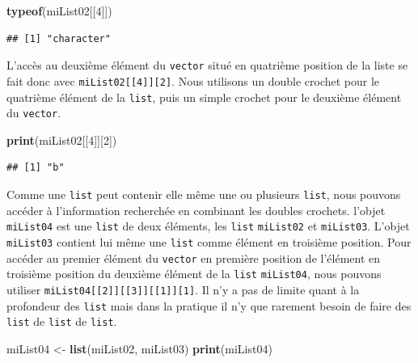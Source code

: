 \documentclass[]{book}
\newenvironment{Shaded}{\begin{snugshade}}{\end{snugshade}}
\newcommand{\KeywordTok}[1]{\textcolor[rgb]{0.13,0.29,0.53}{\textbf{#1}}}
\newcommand{\DecValTok}[1]{\textcolor[rgb]{0.00,0.00,0.81}{#1}}
\newcommand{\StringTok}[1]{\textcolor[rgb]{0.31,0.60,0.02}{#1}}
\newcommand{\NormalTok}[1]{#1}
\begin{document}
\begin{Shaded}
\begin{Highlighting}[]
\KeywordTok{typeof}\NormalTok{(miList02[[}\DecValTok{4}\NormalTok{]])}
\end{Highlighting}
\end{Shaded}

\begin{verbatim}
## [1] "character"
\end{verbatim}

L'accès au deuxième élément du \texttt{vector} situé en quatrième
position de la liste se fait donc avec
\texttt{miList02{[}{[}4{]}{]}{[}2{]}}. Nous utilisons un double crochet
pour le quatrième élément de la \texttt{list}, puis un simple crochet
pour le deuxième élément du \texttt{vector}.

\begin{Shaded}
\begin{Highlighting}[]
\KeywordTok{print}\NormalTok{(miList02[[}\DecValTok{4}\NormalTok{]][}\DecValTok{2}\NormalTok{])}
\end{Highlighting}
\end{Shaded}

\begin{verbatim}
## [1] "b"
\end{verbatim}

Comme une \texttt{list} peut contenir elle même une ou plusieurs
\texttt{list}, nous pouvons accéder à l'information recherchée en
combinant les doubles crochets. l'objet \texttt{miList04} est une
\texttt{list} de deux éléments, les \texttt{list} \texttt{miList02} et
\texttt{miList03}. L'objet \texttt{miList03} contient lui même une
\texttt{list} comme élément en troisième position. Pour accéder au
premier élément du \texttt{vector} en première position de l'élément en
troisième position du deuxième élément de la \texttt{list}
\texttt{miList04}, nous pouvons utiliser
\texttt{miList04{[}{[}2{]}{]}{[}{[}3{]}{]}{[}{[}1{]}{]}{[}1{]}}. Il n'y
a pas de limite quant à la profondeur des \texttt{list} mais dans la
pratique il n'y que rarement besoin de faire des \texttt{list} de
\texttt{list} de \texttt{list}.

\begin{Shaded}
\begin{Highlighting}[]
\NormalTok{miList04 <-}\StringTok{ }\KeywordTok{list}\NormalTok{(miList02, miList03)}
\KeywordTok{print}\NormalTok{(miList04)}
\end{Highlighting}
\end{Shaded}
\end{document}
